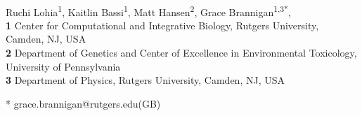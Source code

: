 \documentclass[10pt,letterpaper]{article}
\begin{document}
\vspace*{0.2in}

\begin{flushleft}
{\Large
\textbf{} %
}
\newline
\\
Ruchi Lohia\textsuperscript{1},
Kaitlin Bassi\textsuperscript{1},
Matt Hansen\textsuperscript{2},
Grace Brannigan\textsuperscript{1,3*},
\\
\bigskip
\textbf{1} Center for Computational and Integrative Biology, Rutgers University, Camden, NJ, USA
\\
\textbf{2}  Department of Genetics and Center of Excellence in Environmental Toxicology, University of Pennsylvania 
\\
\textbf{3} Department of Physics, Rutgers University, Camden, NJ, USA
\\
\bigskip

% 
%





* grace.brannigan@rutgers.edu(GB)

\end{flushleft}
\end{document}

